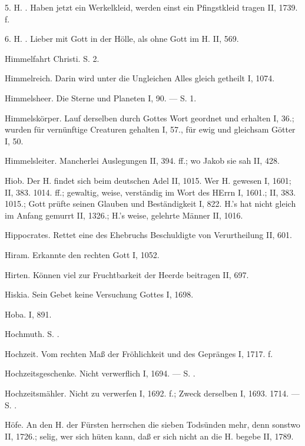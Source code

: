 5. H. . Haben jetzt ein Werkelkleid, werden einst ein Pfingstkleid tragen II, 1739. f.

6. H. . Lieber mit Gott in der Hölle, als ohne Gott im H. II, 569.

Himmelfahrt Christi. S.  2.

Himmelreich. Darin wird unter die Ungleichen Alles gleich getheilt I, 1074.

Himmelsheer. Die Sterne und Planeten I, 90. — S.  1.

Himmelskörper. Lauf derselben durch Gottes Wort geordnet und erhalten I, 36.; wurden für vernünftige Creaturen gehalten I, 57., für ewig und gleichsam Götter I, 50.

Himmelsleiter. Mancherlei Auslegungen II, 394. ff.; wo Jakob sie sah II, 428.

Hiob. Der  H. findet sich beim deutschen Adel II, 1015. Wer H. gewesen I, 1601; II, 383. 1014. ff.; gewaltig, weise, verständig im Wort des HErrn I, 1601.; II, 383. 1015.; Gott prüfte seinen Glauben und Beständigkeit I, 822. H.’s  hat nicht gleich im Anfang gemurrt II, 1326.; H.’s  weise, gelehrte Männer II, 1016.

Hippocrates. Rettet eine des Ehebruchs Beschuldigte von Verurtheilung II, 601.

Hiram. Erkannte den rechten Gott I, 1052.

Hirten. Können viel zur Fruchtbarkeit der Heerde beitragen II, 697.

Hiskia. Sein Gebet keine Versuchung Gottes I, 1698.

Hoba. I, 891.

Hochmuth. S. .

Hochzeit. Vom rechten Maß der Fröhlichkeit und des Gepränges I, 1717. f.

Hochzeitsgeschenke. Nicht verwerflich I, 1694. — S. .

Hochzeitsmähler. Nicht zu verwerfen I, 1692. f.; Zweck derselben I, 1693. 1714. — S. .

Höfe. An den H. der Fürsten herrschen die sieben Todsünden mehr, denn sonstwo II, 1726.; selig, wer sich hüten kann, daß er sich nicht an die H. begebe II, 1789.


